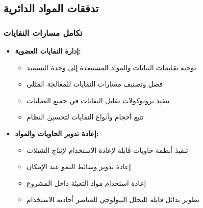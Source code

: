 \subsection{تدفقات المواد الدائرية}

\subsubsection{تكامل مسارات النفايات}
\begin{itemize}
    \item \textbf{إدارة النفايات العضوية:}
    \begin{itemize}
        \item توجيه تقليمات النباتات والمواد المستبعدة إلى وحدة التسميد
        \item فصل وتصنيف مسارات النفايات للمعالجة المثلى
        \item تنفيذ بروتوكولات تقليل النفايات في جميع العمليات
        \item تتبع أحجام وأنواع النفايات لتحسين النظام
    \end{itemize}
    
    \item \textbf{إعادة تدوير الحاويات والمواد:}
    \begin{itemize}
        \item تنفيذ أنظمة حاويات قابلة لإعادة الاستخدام لإنتاج الشتلات
        \item إعادة تدوير وسائط النمو عند الإمكان
        \item إعادة استخدام مواد التعبئة داخل المشروع
        \item تطوير بدائل قابلة للتحلل البيولوجي للعناصر أحادية الاستخدام
    \end{itemize}
\end{itemize}

